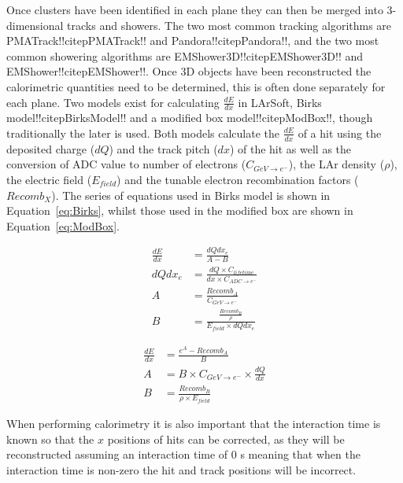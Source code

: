 Once clusters have been identified in each plane they can then be merged into 3-dimensional tracks and showers. The two most common tracking algorithms are PMATrack!!citep{PMATrack}!! and Pandora!!citep{Pandora}!!, and the two most common showering algorithms are EMShower3D!!citep{EMShower3D}!! and EMShower!!citep{EMShower}!!. Once 3D objects have been reconstructed the calorimetric quantities need to be determined, this is often done separately for each plane. Two models exist for calculating $\frac{dE}{dx}$ in LArSoft, Birks model!!citep{BirksModel}!! and a modified box model!!citep{ModBox}!!, though traditionally the later is used. Both models calculate the $\frac{dE}{dx}$ of a hit using the deposited charge ($dQ$) and the track pitch ($dx$) of the hit as well as the conversion of ADC value to number of electrons ($C_{GeV \rightarrow e^{-}}$), the LAr density ($\rho$), the electric field ($E_{field}$) and the tunable electron recombination factors ($Recomb_{X}$). The series of equations used in Birks model is shown in Equation~\ref{eq:Birks}, whilst those used in the modified box are shown in Equation~\ref{eq:ModBox}.

\begin{subequations}\begin{align}
    \frac{dE}{dx} &= \frac{ dQdx_{e} }{ A - B } \label{eq:Birks} \\
    dQdx_{e} &= \frac{ dQ \times C_{lifetime} }{ dx \times C_{ADC \rightarrow e^{-}} } \\
    A &= \frac{ Recomb_{A} }{ C_{GeV \rightarrow e^{-}} } \label{eq:Birks_A}\\
    B &= \frac{ \frac{Recomb_{B}}{\rho} }{ E_{field} \times dQdx_{e} } \label{eq:Birks_B}
\end{align}\end{subequations}

\begin{subequations}\begin{align}
    \frac{dE}{dx} &= \frac{ e^{A} - Recomb_{A} }{ B } \label{eq:ModBox} \\
    A &= B \times C_{GeV \rightarrow e^{-}} \times \frac{dQ}{dx} \label{eq:ModBox_A}\\
    B &= \frac{ Recomb_{B} }{ \rho \times E_{field} } \label{eq:ModBox_B}
\end{align}\end{subequations}
        
When performing calorimetry it is also important that the interaction time is known so that the $x$ positions of hits can be corrected, as they will be reconstructed assuming an interaction time of 0 s meaning that when the interaction time is non-zero the hit and track positions will be incorrect. 
